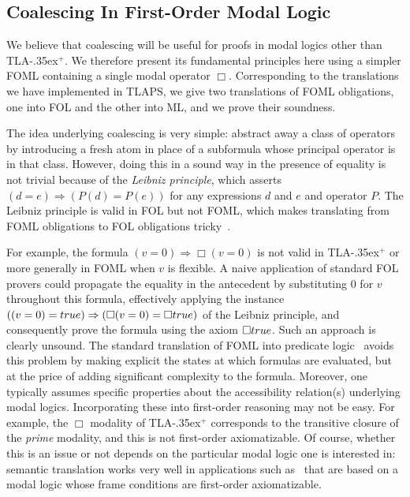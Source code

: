 \documentclass{easychair}
\renewcommand{\implies}{\Rightarrow}
\newcommand{\tlaplus}{\mbox{TLA\kern -.35ex$^+$}\xspace}
\newcommand{\edmargin}[2]{\marginpar{\raggedright\footnotesize\color{red}#1: #2}}
\newcommand{\edmargin}[2]{}
\def\llmargin{\edmargin{LL}}
\newcommand{\TRUE}{\mbox{\sc true}}
\begin{document}
\subsection{Coalescing In First-Order Modal Logic}

We believe that coalescing will be useful for proofs in
modal logics other than \tlaplus. We therefore present its fundamental
principles here using a simpler FOML containing a single modal operator $\Box$.
Corresponding to the translations we have implemented in TLAPS, we give two
translations of FOML obligations, one into FOL and the other into ML, and we
prove their soundness.

The idea underlying coalescing is very simple: abstract away a class
of operators by introducing a fresh atom in place of a subformula
whose principal operator is in that class.
However, doing this in a sound way in the presence of equality is not
trivial because of the \emph{Leibniz principle}, which asserts
 $(d=e) \Rightarrow (P(d) = P(e))$
for any expressions $d$ and $e$ and operator $P$.  The Leibniz
principle is valid in FOL but not FOML, which makes translating from
FOML obligations to FOL obligations tricky~\cite{mendelsohn:foml}.

For example, the formula $(v=0) \implies \Box(v=0)$ is not valid
in \tlaplus or more generally
in FOML when $v$ is flexible.
A naive application of standard FOL provers could
propagate the equality in the antecedent by substituting $0$ for $v$
throughout this formula, effectively applying the instance
$((v=0) = \TRUE) \implies (\Box(v=0) = \Box\TRUE)$
of the Leibniz principle, and consequently prove the formula using the axiom
$\Box\TRUE$. Such an approach is clearly unsound.
The standard translation of FOML into predicate logic~\cite{ohlbach:translation}
avoids this problem by making explicit the states at which formulas are
evaluated, but at the price of adding significant complexity to the
formula. Moreover, one
typically assumes specific properties about the accessibility relation(s)
underlying modal logics.  Incorporating these into first-order reasoning may
not be easy. For example, the $\Box$ modality of \tlaplus corresponds to the
transitive closure of the \emph{prime} modality, and this is not first-order
axiomatizable. Of course, whether this is an issue or not depends on the
particular modal logic one is interested in: semantic translation works very
well in applications such as~\cite{benzmueller:god} that are based on a modal
logic whose frame conditions are first-order axiomatizable.
\end{document}

